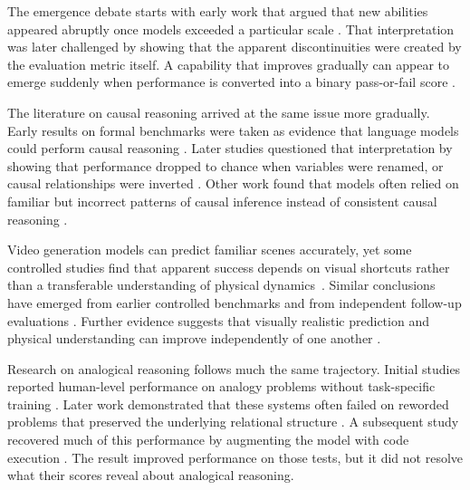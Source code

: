 \documentclass[acmsmall,screen,review,anonymous]{acmart}
\begin{document}
The emergence debate starts with early work that argued that new abilities appeared abruptly once models exceeded a particular scale \citep{wei2022emergent}. 
%
That interpretation was later challenged by showing that the apparent discontinuities were created by the evaluation metric itself.
%
A capability that improves gradually can appear to emerge suddenly when performance is converted into a binary pass-or-fail score \citep{schaeffer2023emergent}.

The literature on causal reasoning arrived at the same issue more gradually.
%
Early results on formal benchmarks were taken as evidence that language models could perform causal reasoning \citep{jin2023cladder}.
%
Later studies questioned that interpretation by showing that performance dropped to chance when variables were renamed, or causal relationships were inverted \citep{jin2024largelanguagemodelsinfer}.
%
Other work found that models often relied on familiar but incorrect patterns of causal inference instead of consistent causal reasoning \citep{joshi-etal-2024-llms}.

Video generation models can predict familiar scenes accurately, yet some controlled studies find that apparent success depends on visual shortcuts rather than a transferable understanding of physical dynamics~\citep{kang2025how}.
%
Similar conclusions have emerged from earlier controlled benchmarks \citep{CLEVRER2020ICLR, mao2025clevrerhumansdescribingphysicalcausal, tung2023physion, chow2025physbenchbenchmarkingenhancingvisionlanguage} and from independent follow-up evaluations \citep{bansal2026videophy}.
%
Further evidence suggests that visually realistic prediction and physical understanding can improve independently of one another \citep{motamed2026physics}.

Research on analogical reasoning follows much the same trajectory.
%
Initial studies reported human-level performance on analogy problems without task-specific training \citep{Webb2022EmergentAR}.
%
Later work demonstrated that these systems often failed on reworded problems that preserved the underlying relational structure \citep{hodel2024responseemergentanalogicalreasoning, lewis2024usingcounterfactualtasksevaluate}.
%
A subsequent study recovered much of this performance by augmenting the model with code execution \citep{webb2025evidence}.
%
The result improved performance on those tests, but it did not resolve what their scores reveal about analogical reasoning.
\end{document}
